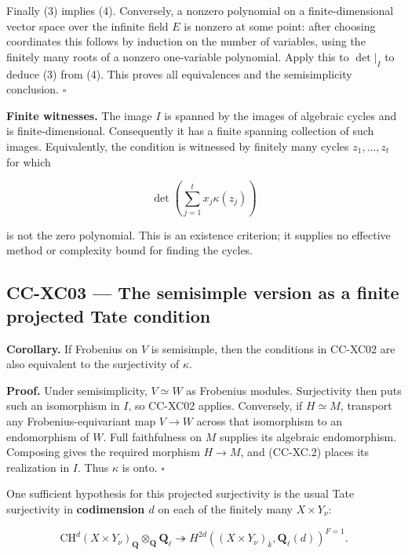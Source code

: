\documentclass[11pt,a4paper]{article}
\theoremstyle{definition}\newtheorem{definition}[theorem]{Definition}
\theoremstyle{remark}\newtheorem{remark}[theorem]{Remark}
\begin{document}
Finally (3) implies (4). Conversely, a nonzero polynomial on a
finite-dimensional vector space over the infinite field \(E\) is nonzero
at some point: after choosing coordinates this follows by induction on
the number of variables, using the finitely many roots of a nonzero
one-variable polynomial. Apply this to \(\det|_I\) to deduce (3) from
(4). This proves all equivalences and the semisimplicity conclusion.
\(\square\)

\textbf{Finite witnesses.} The image \(I\) is spanned by the images of
algebraic cycles and is finite-dimensional. Consequently it has a finite
spanning collection of such images. Equivalently, the condition is
witnessed by finitely many cycles \(z_1,\ldots,z_t\) for which

\[
 \det\!\left(\sum_{j=1}^t x_j\kappa(z_j)\right)
\]

is not the zero polynomial. This is an existence criterion; it supplies
no effective method or complexity bound for finding the cycles.

\subsection{CC-XC03 --- The semisimple version as a finite projected
Tate
condition}\label{cc-xc03-the-semisimple-version-as-a-finite-projected-tate-condition}

\textbf{Corollary.} If Frobenius on \(V\) is semisimple, then the
conditions in CC-XC02 are also equivalent to the surjectivity of
\(\kappa\).

\textbf{Proof.} Under semisimplicity, \(V\simeq W\) as Frobenius
modules. Surjectivity then puts such an isomorphism in \(I\), so CC-XC02
applies. Conversely, if \(H\simeq M\), transport any
Frobenius-equivariant map \(V\to W\) across that isomorphism to an
endomorphism of \(W\). Full faithfulness on \(M\) supplies its algebraic
endomorphism. Composing gives the required morphism \(H\to M\), and
(CC-XC.2) places its realization in \(I\). Thus \(\kappa\) is onto.
\(\square\)

One sufficient hypothesis for this projected surjectivity is the usual
Tate surjectivity in \textbf{codimension \(d\)} on each of the finitely
many \(X\times Y_\nu\):

\[
 \mathrm{CH}^d(X\times Y_\nu)_{\mathbf Q}
       \otimes_{\mathbf Q}\mathbf Q_\ell
 \twoheadrightarrow
 H^{2d}((X\times Y_\nu)_{\bar k},\mathbf Q_\ell(d))^{F=1}.
                                                        \tag{CC-XC.5}
\]
\end{document}
